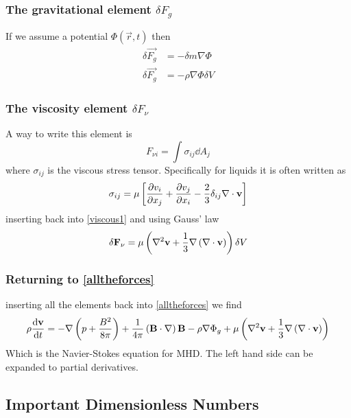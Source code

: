 \subsubsection{The gravitational element \(\delta F_g\)}
If we assume a potential \(\Phi(\vec{r},t)\) then
\begin{align}
    \delta\vec{F_g} &= -\delta m \nabla\Phi \\
    \delta \vec{F_g} &= -\rho\nabla\Phi\delta V
\end{align}
\subsubsection{The viscosity element \(\delta F_\nu \)}
A way to write this element is
\begin{equation}\label{viscous1}
    F_{\nu i} = \int \sigma_{ij}\dd A_j
\end{equation}
where \(\sigma_{ij}\) is the viscous stress tensor. Specifically for liquids it is often written as
\begin{equation}
    \sigma_{ij} = \mu\left[\diffp{v_i}{x_j}+\diffp{v_j}{x_i}-\frac{2}{3}\delta_{ij}\nabla\cdot\vec{v}\right]
\end{equation}
inserting back into \ref{viscous1} and using Gauss' law
\begin{equation}
    \delta\mathbf{F_\nu} = \mu\left(\nabla^2\mathbf{v} + \frac{1}{3}\nabla\left(\nabla\cdot\mathbf{v}\right)\right)\delta V
\end{equation}
\subsubsection{Returning to \ref{alltheforces}}
inserting all the elements back into \ref{alltheforces} we find
\begin{equation}
    \rho\diff{\vec{v}}{t} = -\nabla\ins{p+\frac{B^2}{8\pi}}+\frac{1}{4\pi}\ins{\vec{B}\cdot\nabla}\vec{B}-\rho\nabla\Phi_g + \mu\ins{\nabla^2\vec{v}+\frac{1}{3}\nabla\ins{\nabla\cdot\vec{v}}}
\end{equation}
Which is the Navier-Stokes equation for MHD. The left hand side can be expanded to partial derivatives.
\subsection{Important Dimensionless Numbers}

